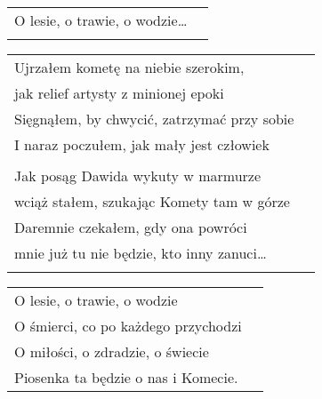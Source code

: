 \documentclass[a5paper]{article}
\begin{document}
\noindent
\begin{tabular}{@{}p{9.50cm}p{3cm}@{}}
O lesie, o trawie, o wodzie… \\ \\
\end{tabular}

\noindent
\begin{tabular}{@{}p{9.50cm}p{3cm}@{}}
Ujrzałem kometę na niebie szerokim, \\
jak relief artysty z minionej epoki \\
Sięgnąłem, by chwycić, zatrzymać przy sobie \\
I naraz poczułem, jak mały jest człowiek \\ \\
 
Jak posąg Dawida wykuty w marmurze \\
wciąż stałem, szukając Komety tam w górze \\
Daremnie czekałem, gdy ona powróci \\
mnie już tu nie będzie, kto inny zanuci… \\ \\
\end{tabular}

\begin{tabular}{@{}p{9.50cm}p{3cm}@{}}
\noindent
O lesie, o trawie, o wodzie \\
O śmierci, co po każdego przychodzi \\
O miłości, o zdradzie, o świecie \\
Piosenka ta będzie o nas i Komecie.
\end{tabular}
\end{document}
